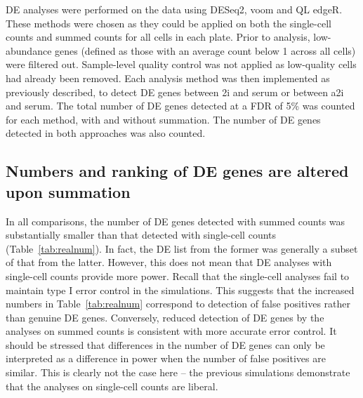 \documentclass[oupdraft]{bio}
\begin{document}


DE analyses were performed on the data using DESeq2, voom and QL edgeR.
These methods were chosen as they could be applied on both the single-cell counts and summed counts for all cells in each plate. 
Prior to analysis, low-abundance genes (defined as those with an average count below 1 across all cells) were filtered out.
Sample-level quality control was not applied as low-quality cells had already been removed.
Each analysis method was then implemented as previously described, to detect DE genes between 2i and serum or between a2i and serum.
The total number of DE genes detected at a FDR of 5\% was counted for each method, with and without summation.
The number of DE genes detected in both approaches was also counted.

\subsection{Numbers and ranking of DE genes are altered upon summation}
In all comparisons, the number of DE genes detected with summed counts was substantially smaller than that detected with single-cell counts (Table~\ref{tab:realnum}).
In fact, the DE list from the former was generally a subset of that from the latter.
However, this does not mean that DE analyses with single-cell counts provide more power.
Recall that the single-cell analyses fail to maintain type I error control in the simulations.
This suggests that the increased numbers in Table~\ref{tab:realnum} correspond to detection of false positives rather than genuine DE genes.
Conversely, reduced detection of DE genes by the analyses on summed counts is consistent with more accurate error control.
It should be stressed that differences in the number of DE genes can only be interpreted as a difference in power when the number of false positives are similar.
This is clearly not the case here -- the previous simulations demonstrate that the analyses on single-cell counts are liberal.
\end{document}

